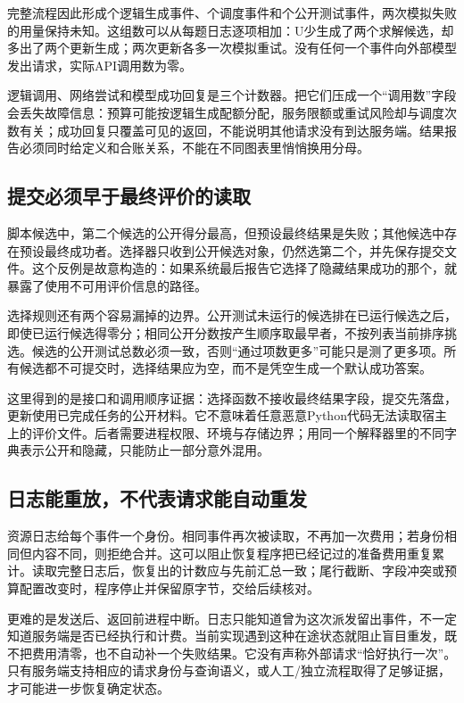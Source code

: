 完整流程因此形成个逻辑生成事件、个调度事件和个公开测试事件，两次模拟失败的用量保持未知。这组数可以从每题日志逐项相加：U少生成了两个求解候选，却多出了两个更新生成；两次更新各多一次模拟重试。没有任何一个事件向外部模型发出请求，实际API调用数为零。

逻辑调用、网络尝试和模型成功回复是三个计数器。把它们压成一个“调用数”字段会丢失故障信息：预算可能按逻辑生成配额分配，服务限额或重试风险却与调度次数有关；成功回复只覆盖可见的返回，不能说明其他请求没有到达服务端。结果报告必须同时给定义和合账关系，不能在不同图表里悄悄换用分母。

\subsection{提交必须早于最终评价的读取}

脚本候选中，第二个候选的公开得分最高，但预设最终结果是失败；其他候选中存在预设最终成功者。选择器只收到公开候选对象，仍然选第二个，并先保存提交文件。这个反例是故意构造的：如果系统最后报告它选择了隐藏结果成功的那个，就暴露了使用不可用评价信息的路径。

选择规则还有两个容易漏掉的边界。公开测试未运行的候选排在已运行候选之后，即使已运行候选得零分；相同公开分数按产生顺序取最早者，不按列表当前排序挑选。候选的公开测试总数必须一致，否则“通过项数更多”可能只是测了更多项。所有候选都不可提交时，选择结果应为空，而不是凭空生成一个默认成功答案。

这里得到的是接口和调用顺序证据：选择函数不接收最终结果字段，提交先落盘，更新使用已完成任务的公开材料。它不意味着任意恶意Python代码无法读取宿主上的评价文件。后者需要进程权限、环境与存储边界；用同一个解释器里的不同字典表示公开和隐藏，只能防止一部分意外混用。

\subsection{日志能重放，不代表请求能自动重发}

资源日志给每个事件一个身份。相同事件再次被读取，不再加一次费用；若身份相同但内容不同，则拒绝合并。这可以阻止恢复程序把已经记过的准备费用重复累计。读取完整日志后，恢复出的计数应与先前汇总一致；尾行截断、字段冲突或预算配置改变时，程序停止并保留原字节，交给后续核对。

更难的是发送后、返回前进程中断。日志只能知道曾为这次派发留出事件，不一定知道服务端是否已经执行和计费。当前实现遇到这种在途状态就阻止盲目重发，既不把费用清零，也不自动补一个失败结果。它没有声称外部请求“恰好执行一次”。只有服务端支持相应的请求身份与查询语义，或人工/独立流程取得了足够证据，才可能进一步恢复确定状态。

